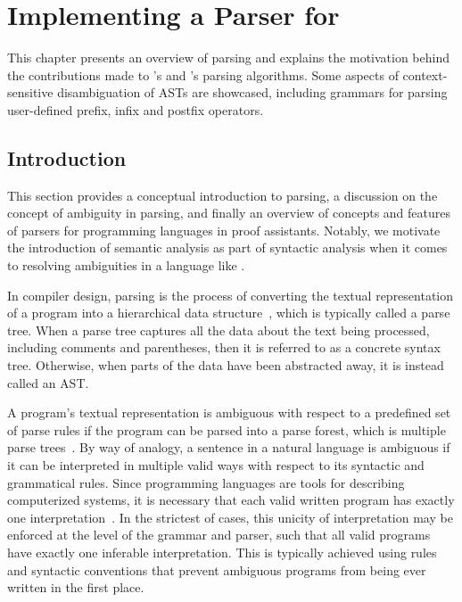 \chapter{Implementing a Parser for \Beluga}

\newcommand{\prefix}{\mathsf{op}_{\text{prefix}}}
\newcommand{\infix}{\mathsf{op}_{\text{infix}}}
\newcommand{\infixl}{\mathsf{op}_{\text{infix}}^L}
\newcommand{\infixr}{\mathsf{op}_{\text{infix}}^R}
\newcommand{\infixn}{\mathsf{op}_{\text{infix}}^N}
\newcommand{\postfix}{\mathsf{op}_{\text{postfix}}}

This chapter presents an overview of parsing and explains the motivation behind the contributions made to \Beluga's and \Harpoon's parsing algorithms.
Some aspects of context-sensitive disambiguation of \acp{AST} are showcased, including grammars for parsing user-defined prefix, infix and postfix operators.

\section{Introduction}\label{section:parser-introduction}

This section provides a conceptual introduction to parsing, a discussion on the concept of ambiguity in parsing, and finally an overview of concepts and features of parsers for programming languages in proof assistants.
Notably, we motivate the introduction of semantic analysis as part of syntactic analysis when it comes to resolving ambiguities in a language like \Beluga.


In compiler design, parsing is the process of converting the textual representation of a program into a hierarchical data structure~\cite{aho2007compilers, afroozeh2019practical}, which is typically called a parse tree.
When a parse tree captures all the data about the text being processed, including comments and parentheses, then it is referred to as a concrete syntax tree.
Otherwise, when parts of the data have been abstracted away, it is instead called an \ac{AST}.


A program's textual representation is ambiguous with respect to a predefined set of parse rules if the program can be parsed into a parse forest, which is multiple parse trees~\cite{aho2007compilers}.
By way of analogy, a sentence in a natural language is ambiguous if it can be interpreted in multiple valid ways with respect to its syntactic and grammatical rules.
Since programming languages are tools for describing computerized systems, it is necessary that each valid written program has exactly one interpretation~\cite{aho2007compilers}.
In the strictest of cases, this unicity of interpretation may be enforced at the level of the grammar and parser, such that all valid programs have exactly one inferable interpretation.
This is typically achieved using rules and syntactic conventions that prevent ambiguous programs from being ever written in the first place.

